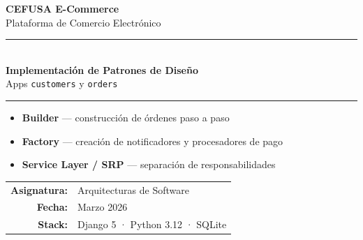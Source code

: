 \documentclass[12pt, a4paper]{article}
\begin{document}
\begin{titlepage}
    \centering
    \vspace*{2cm}

    {\Huge\bfseries\color{azulCEFUSA} CEFUSA E-Commerce}\\[0.6em]
    {\Large\color{gray} Plataforma de Comercio Electrónico}

    \vspace{1.5cm}
    \rule{0.7\linewidth}{1.5pt}\\[0.4em]
    {\LARGE\bfseries Implementación de Patrones de Diseño}\\
    {\large Apps \texttt{customers} y \texttt{orders}}\\
    \rule{0.7\linewidth}{1.5pt}

    \vspace{2cm}

    \begin{tcolorbox}[
        colback=azulCEFUSA!8, colframe=azulCEFUSA,
        width=0.75\linewidth, arc=6pt,
        title=\textbf{Patrones implementados},
        fonttitle=\bfseries\large
    ]
        \begin{itemize}[leftmargin=1.5em]
            \item \textbf{Builder} — construcción de órdenes paso a paso
            \item \textbf{Factory} — creación de notificadores y procesadores de pago
            \item \textbf{Service Layer / SRP} — separación de responsabilidades
        \end{itemize}
    \end{tcolorbox}

    \vfill

    \begin{tabular}{rl}
        \textbf{Asignatura:} & Arquitecturas de Software \\[0.3em]
        \textbf{Fecha:}      & Marzo 2026 \\[0.3em]
        \textbf{Stack:}      & Django 5 · Python 3.12 · SQLite \\
    \end{tabular}
\end{titlepage}

\tableofcontents
\newpage

\end{document}
